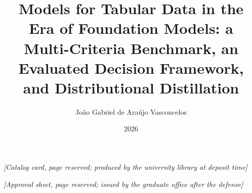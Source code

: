 \documentclass[en,oneside,onehalfspacing,msc]{risethesis}
\title{Models for Tabular Data in the Era of Foundation Models:
a Multi-Criteria Benchmark, an Evaluated Decision Framework, and
Distributional Distillation}
\date{2026}
\author{João Gabriel de Araújo Vasconcelos}
\begin{document}
\frontpage
\presentationpage

\begin{fichacatalografica}
\vspace*{\fill}
\begin{center}\itshape [Catalog card, page reserved; produced by
the university library at deposit time]\end{center}
\vspace*{\fill}
\end{fichacatalografica}

\newpage\thispagestyle{empty}\vspace*{\fill}
\begin{center}\itshape [Approval sheet, page reserved; issued by
the graduate office after the defense]\end{center}
\vspace*{\fill}\clearpage



\acknowledgements




\abstract


\resumo




\listoffigures
\listoftables

\tableofcontents
\clearpage
\pagestyle{fancy}









\cleardoublepage
{}



\clearpage


\appendixmatter\clearpage\appendix

\end{document}
